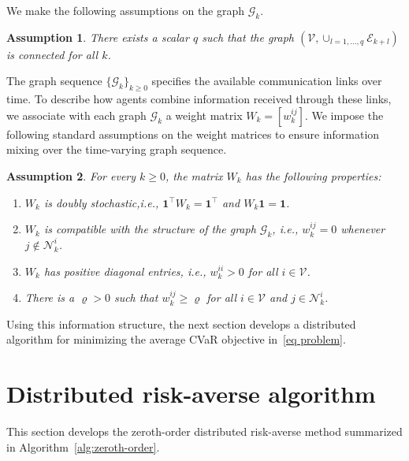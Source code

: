 \documentclass[twocolumn]{autart}    %
\newtheorem{assumption}{Assumption}
\newcommand{\1}{\mathbf{1}}
\newcommand{\T}{\intercal}
\begin{document}
We make the following assumptions on the graph $\mathcal{G}_k$.
\begin{assumption}\label{assumption:graph q}
There exists a scalar $q$ such that the graph $(\mathcal{V},\cup_{l=1,\dots,q}\mathcal{E}_{k+l})$ is connected for all $k$. 
\end{assumption}
The graph sequence $\{\mathcal{G}_k\}_{k\geq 0}$ specifies the
available communication links over time. 
To describe how agents combine information received through these links, we associate with
each graph $\mathcal{G}_k$ a weight matrix
$W_k=[w_k^{ij}]$.
We impose the following standard assumptions on the weight matrices
to ensure information mixing over the time-varying graph sequence. 
\begin{assumption}\label{assumption:graph}
For every $k \geq 0$, the matrix $W_k$ has the following properties:
\begin{enumerate}
    \item $W_k$ is doubly stochastic,i.e., $\1^{\T}W_k = \1^{\T}$ and $W_k \1 = \1 $.
    \item $W_k$ is compatible with the structure of the graph $\mathcal{G}_k$, i.e., $w_k^{ij}=0$ whenever $j\notin\mathcal N_k^i$.
    \item $W_k$ has positive diagonal entries, i.e., $w_k^{ii} > 0$ for all $i \in \mathcal{V}$.
    \item There is a $\varrho>0$ such that $w_k^{ij}\geq\varrho$ for all $i\in\mathcal V$ and $j\in\mathcal N_k^i$.
\end{enumerate}
\end{assumption} 

Using this information structure, the next section develops a distributed algorithm for minimizing the average CVaR objective in~\eqref{eq problem}.
 
\section{Distributed risk-averse algorithm}\label{sec:main result} 
This section develops the zeroth-order distributed risk-averse method summarized in Algorithm~\ref{alg:zeroth-order}.
\end{document}

